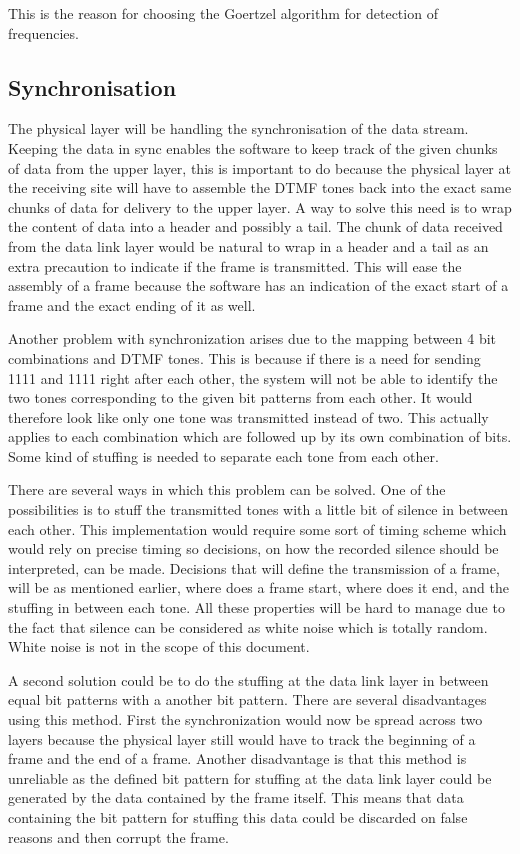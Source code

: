 	This is the reason for choosing the Goertzel algorithm for detection of frequencies.
	
	\subsection{Synchronisation}\label{sec:physical_sync}
	The physical layer will be handling the synchronisation of the data stream. Keeping the data in sync enables the software to
	keep track of the given chunks of data from the upper layer, this is important to do because the physical layer at the receiving
	site will have to assemble the DTMF tones back into the exact same chunks of data for delivery to the upper layer.
	A way to solve this need is to wrap the content of data into a header and possibly a tail. The chunk of data received from the 
	data link layer would be natural to wrap in a header and a tail as an extra precaution to indicate if the frame is transmitted.
	This will ease the assembly of a frame because the software has an indication of the exact start of a frame and the exact ending
	of it as well.
	
	Another problem with synchronization arises due to the mapping between 4 bit combinations and DTMF tones. This is because if there is a
	need for sending 1111 and 1111 right after each other, the system will not be able to identify the two tones corresponding to the
	given bit patterns from each other. It would therefore look like only one tone was transmitted instead of two. This actually applies
	to each combination which are followed up by its own combination of bits. Some kind of stuffing is needed to separate each tone
	from each other.
	
	There are several ways in which this problem can be solved. One of the possibilities is to stuff the transmitted tones with a little
	bit of silence in between each other. This implementation would require some sort of timing scheme which would rely on precise timing
	so decisions, on how the recorded silence should be interpreted, can be made. Decisions that will define the transmission of a frame, will be as 
	mentioned earlier, where does a frame start, where does it end, and the stuffing in between each tone. All these properties will be
	hard to manage due to the fact that silence can be considered as white noise which is totally random. White noise is not in the scope of this 
	document.
	
	A second solution could be to do the stuffing at the data link layer in between equal bit patterns with a another bit pattern. 
	There are several disadvantages using this method. First the synchronization would now be spread across two layers because
	the physical layer still would have to track the beginning of a frame and the end of a frame. Another disadvantage is that this 
	method is unreliable as the defined bit pattern for stuffing at the data link layer could be generated by the data contained by the 
	frame itself. This means that data containing the bit pattern for stuffing this data could be discarded on false reasons and
	then corrupt the frame.
	
